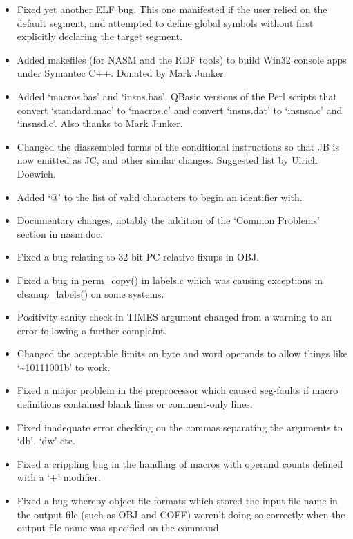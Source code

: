 \begin{itemize}
    \item{Fixed yet another ELF bug. This one manifested if the user relied on
        the default segment, and attempted to define global symbols without
        first explicitly declaring the target segment.}
    \item{Added makefiles (for NASM and the RDF tools) to build Win32 console
        apps under Symantec C++. Donated by Mark Junker.}
    \item{Added `macros.bas' and `insns.bas', QBasic versions of the Perl
        scripts that convert `standard.mac' to `macros.c' and convert
        `insns.dat' to `insnsa.c' and `insnsd.c'. Also thanks to Mark
        Junker.}
    \item{Changed the diassembled forms of the conditional instructions so
        that JB is now emitted as JC, and other similar changes. Suggested
        list by Ulrich Doewich.}
    \item{Added `@' to the list of valid characters to begin an identifier with.}
    \item{Documentary changes, notably the addition of the `Common Problems'
        section in nasm.doc.}
    \item{Fixed a bug relating to 32-bit PC-relative fixups in OBJ.}
    \item{Fixed a bug in perm\_copy() in labels.c which was causing exceptions
        in cleanup\_labels() on some systems.}
    \item{Positivity sanity check in TIMES argument changed from a warning to
        an error following a further complaint.}
    \item{Changed the acceptable limits on byte and word operands to allow
        things like `\textasciitilde 10111001b' to work.}
    \item{Fixed a major problem in the preprocessor which caused seg-faults if
        macro definitions contained blank lines or comment-only lines.}
    \item{Fixed inadequate error checking on the commas separating the
        arguments to `db', `dw' etc.}
    \item{Fixed a crippling bug in the handling of macros with operand counts
        defined with a `+' modifier.}
    \item{Fixed a bug whereby object file formats which stored the input file
        name in the output file (such as OBJ and COFF) weren't doing so
        correctly when the output file name was specified on the command
}
\end{itemize}

